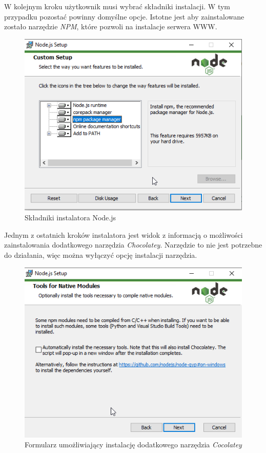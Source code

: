 \documentclass[a4paper,twoside,12pt]{book}
\begin{document}
W kolejnym kroku użytkownik musi wybrać składniki instalacji. W tym przypadku pozostać powinny domyślne opcje. Istotne jest aby zainstalowane zostało narzędzie \textit{NPM}, które pozwoli na instalacje serwera WWW.
\begin{figure}[h!]
	\centering
	\includegraphics[width=0.6\linewidth]{../zrzuty_ekranu/instalacja_nodejs/node4}
	\caption{Składniki instalatora Node.js}
	\label{fig:node4}
\end{figure}
\FloatBarrier

Jednym z ostatnich kroków instalatora jest widok z informacją o możliwości zainstalowania dodatkowego narzędzia \textit{Chocolatey}. Narzędzie to nie jest potrzebne do działania, więc można wyłączyć opcję instalacji narzędzia.
\begin{figure}[h!]
	\centering
	\includegraphics[width=0.6\linewidth]{../zrzuty_ekranu/instalacja_nodejs/node5}
	\caption{Formularz umożliwiający instalację dodatkowego narzędzia \textit{Cocolatey}}
	\label{fig:node5}
\end{figure}
\FloatBarrier
\end{document}
